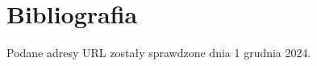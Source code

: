 \section{Bibliografia}
Podane adresy URL zostały sprawdzone dnia 1 grudnia 2024.
\printbibliography[title={\vspace{-2.4em}}]